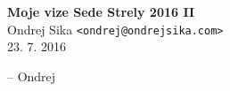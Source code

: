 \documentclass[12pt,a4paper]{article}
\begin{document}

\begin{center}
{\LARGE \bf Moje vize Sede Strely 2016 II}\\
\vspace*{0.4cm}
{\large Ondrej Sika {\tt <ondrej@ondrejsika.com>}}\\
\vspace*{0.3cm}
23. 7. 2016\\
\end{center}


-- Ondrej
\end{document}
